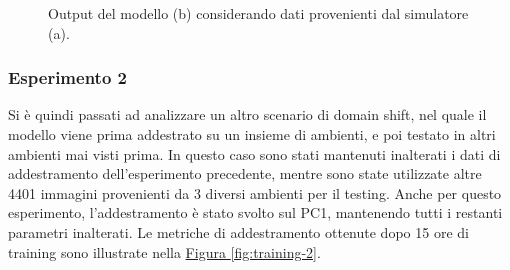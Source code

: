 \documentclass[12pt]{report}
\begin{document}
\begin{figure}[h!]
	\centering
	\hspace{0.01\textwidth}
	\caption{Output del modello (b) considerando dati provenienti dal simulatore (a).}
	\label{fig:prediction-1}
\end{figure}

\subsubsection{Esperimento 2}
\label{sec:esperimento_2}

Si è quindi passati ad analizzare un altro scenario di domain shift, nel quale il modello viene prima addestrato su un insieme di ambienti, e poi testato in altri ambienti mai visti prima. In questo caso sono stati mantenuti inalterati i dati di addestramento dell'esperimento precedente, mentre sono state utilizzate altre 4401 immagini provenienti da 3 diversi ambienti per il testing. Anche per questo esperimento, l'addestramento è stato svolto sul PC1, mantenendo tutti i restanti parametri inalterati. Le metriche di addestramento ottenute dopo 15 ore di training sono illustrate nella \hyperref[fig:training-2]{Figura \ref{fig:training-2}}.
\end{document}

